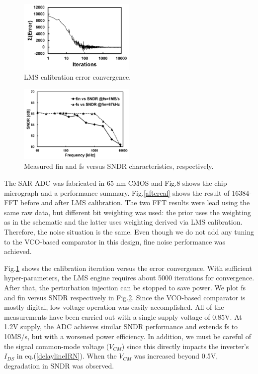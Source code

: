 \documentclass[journal]{IEEEtran}
\begin{document}
\begin{figure}[!]
\centering
 \includegraphics[width=0.5\textwidth]{figs/lms.png}
  \caption{LMS calibration error convergence.}
  \label{lms}
\end{figure}

\begin{figure}[!]
\centering
 \includegraphics[width=0.5\textwidth]{figs/freq-sndr.png}
  \caption{Measured fin and fs versus SNDR characteristics, respectively.}
  \label{freqvssndr}
\end{figure}



The SAR ADC was fabricated in 65-nm CMOS and Fig.8 shows the chip micrograph and a performance summary. 
Fig.\ref{aftercal} shows the result of 16384-FFT before and after LMS calibration. The two FFT results were lead using the same raw data, but different bit weighting was used: the prior uses the weighting as in the schematic and the latter uses weighting derived via LMS calibration. Therefore, the noise situation is the same. Even though we do not add any tuning to the VCO-based comparator in this design, fine noise performance was achieved. 

Fig.\ref{lms} shows the calibration iteration versus the error convergence. With sufficient hyper-parameters, the LMS engine requires about 5000 iterations for convergence. After that, the perturbation injection can be stopped to save power. 
We plot fs and fin versus SNDR respectively in Fig.\ref{freqvssndr}. Since the VCO-based comparator is mostly digital, low voltage operation was easily accomplished. All of the measurements have been carried out with a single supply voltage of 0.85V. At 1.2V supply, the ADC achieves similar SNDR performance and extends fs to 10MS/s, but with a worsened power efficiency. In addition, we must be careful of the signal common-mode voltage ($V_{CM}$) since this directly impacts the inverter’s $I_{DS}$ in eq.(\ref{delaylineIRN}). When the $V_{CM}$ was increased beyond 0.5V, degradation in SNDR was observed.
\end{document}
